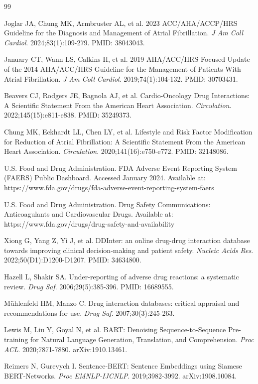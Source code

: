\documentclass[11pt,a4paper]{article}
\begin{document}
\begin{thebibliography}{99}

Joglar JA, Chung MK, Armbruster AL, et al.
2023 ACC/AHA/ACCP/HRS Guideline for the Diagnosis and Management of Atrial Fibrillation.
\textit{J Am Coll Cardiol}. 2024;83(1):109-279. PMID: 38043043.

January CT, Wann LS, Calkins H, et al.
2019 AHA/ACC/HRS Focused Update of the 2014 AHA/ACC/HRS Guideline for the Management of Patients With Atrial Fibrillation.
\textit{J Am Coll Cardiol}. 2019;74(1):104-132. PMID: 30703431.

Beavers CJ, Rodgers JE, Bagnola AJ, et al.
Cardio-Oncology Drug Interactions: A Scientific Statement From the American Heart Association.
\textit{Circulation}. 2022;145(15):e811-e838. PMID: 35249373.

Chung MK, Eckhardt LL, Chen LY, et al.
Lifestyle and Risk Factor Modification for Reduction of Atrial Fibrillation: A Scientific Statement From the American Heart Association.
\textit{Circulation}. 2020;141(16):e750-e772. PMID: 32148086.

U.S. Food and Drug Administration.
FDA Adverse Event Reporting System (FAERS) Public Dashboard.
Accessed January 2024. Available at: https://www.fda.gov/drugs/fda-adverse-event-reporting-system-faers

U.S. Food and Drug Administration.
Drug Safety Communications: Anticoagulants and Cardiovascular Drugs.
Available at: https://www.fda.gov/drugs/drug-safety-and-availability

Xiong G, Yang Z, Yi J, et al.
DDInter: an online drug-drug interaction database towards improving clinical decision-making and patient safety.
\textit{Nucleic Acids Res}. 2022;50(D1):D1200-D1207. PMID: 34634800.

Hazell L, Shakir SA.
Under-reporting of adverse drug reactions: a systematic review.
\textit{Drug Saf}. 2006;29(5):385-396. PMID: 16689555.

Mühlenfeld HM, Manzo C.
Drug interaction databases: critical appraisal and recommendations for use.
\textit{Drug Saf}. 2007;30(3):245-263.

Lewis M, Liu Y, Goyal N, et al.
BART: Denoising Sequence-to-Sequence Pre-training for Natural Language Generation, Translation, and Comprehension.
\textit{Proc ACL}. 2020;7871-7880. arXiv:1910.13461.

Reimers N, Gurevych I.
Sentence-BERT: Sentence Embeddings using Siamese BERT-Networks.
\textit{Proc EMNLP-IJCNLP}. 2019;3982-3992. arXiv:1908.10084.

\end{thebibliography}
\end{document}
